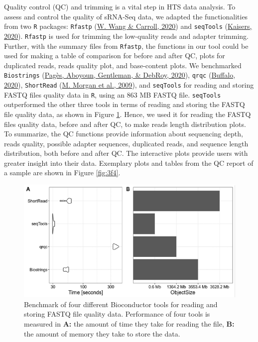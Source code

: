 \documentclass[12pt,twoside]{reedthesis}
\begin{document}
Quality control (QC) and trimming is a vital step in HTS data analysis.
To assess and control the quality of sRNA-Seq data, we adapted the
functionalities from two \texttt{R} packages: \texttt{Rfastp} (\protect\hyperlink{ref-wang2020}{W. Wang \& Carroll, 2020}) and
\texttt{seqTools} (\protect\hyperlink{ref-kaisers2020}{Kaisers, 2020}). \texttt{Rfastp} is used for trimming the low-quality
reads and adapter trimming. Further, with the summary files from
\texttt{Rfastp}, the functions in our tool could be used for making a table of
comparison for before and after QC, plots for duplicated reads, reads
quality plot, and base-content plots. We benchmarked \texttt{Biostrings}
(\protect\hyperlink{ref-paguxe8s2020}{Pagès, Aboyoun, Gentleman, \& DebRoy, 2020}), \texttt{qrqc} (\protect\hyperlink{ref-buffalo2020}{Buffalo, 2020}), \texttt{ShortRead} (\protect\hyperlink{ref-morgan2009}{M. Morgan et al., 2009}), and
\texttt{seqTools} for reading and storing FASTQ files quality data in \texttt{R},
using an 863 MB FASTQ file. \texttt{seqTools} outperformed the other three
tools in terms of reading and storing the FASTQ file quality data, as
shown in Figure \ref{fig:3f3}. Hence, we used it for reading the FASTQ
files quality data, before and after QC, to make reads length
distribution plots. To summarize, the QC functions provide information
about sequencing depth, reads quality, possible adapter sequences,
duplicated reads, and sequence length distribution, both before and
after QC. The interactive plots provide users with greater insight into
their data. Exemplary plots and tables from the QC report of a sample
are shown in Figure \ref{fig:3f4}.





\begin{figure}[htbp]

{\centering \includegraphics{thesis_files/figure-latex/3f3-1} 

}

\caption[Benchmark of four different Bioconductor tools for reading and storing FASTQ file quality data]{Benchmark of four different Bioconductor tools for reading
and storing FASTQ file quality data. Performance of four tools is
measured in \textbf{A:} the amount of time they take for reading the file,
\textbf{B:} the amount of memory they take to store the data.}\label{fig:3f3}
\end{figure}
\end{document}
